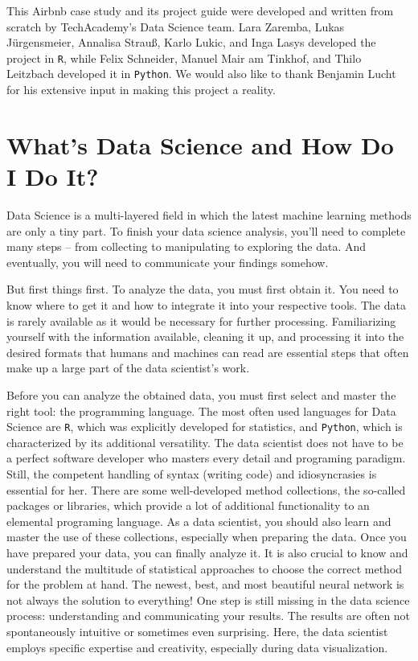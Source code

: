 \documentclass[
  11pt,
]{article}
\begin{document}
This Airbnb case study and its project guide were developed and written from scratch by TechAcademy's Data Science team. Lara Zaremba, Lukas Jürgensmeier, Annalisa Strauß, Karlo Lukic, and Inga Lasys developed the project in \texttt{R}, while Felix Schneider, Manuel Mair am Tinkhof, and Thilo Leitzbach developed it in \texttt{Python}. We would also like to thank Benjamin Lucht for his extensive input in making this project a reality.

\hypertarget{whats-data-science-and-how-do-i-do-it}{%
\section{What's Data Science and How Do I Do It?}\label{whats-data-science-and-how-do-i-do-it}}

Data Science is a multi-layered field in which the latest machine learning methods are only a tiny part. To finish your data science analysis, you'll need to complete many steps -- from collecting to manipulating to exploring the data. And eventually, you will need to communicate your findings somehow.

But first things first. To analyze the data, you must first obtain it. You need to know where to get it and how to integrate it into your respective tools. The data is rarely available as it would be necessary for further processing. Familiarizing yourself with the information available, cleaning it up, and processing it into the desired formats that humans and machines can read are essential steps that often make up a large part of the data scientist's work.

Before you can analyze the obtained data, you must first select and master the right tool: the programming language. The most often used languages for Data Science are \texttt{R}, which was explicitly developed for statistics, and \texttt{Python}, which is characterized by its additional versatility. The data scientist does not have to be a perfect software developer who masters every detail and programing paradigm. Still, the competent handling of syntax (writing code) and idiosyncrasies is essential for her.
There are some well-developed method collections, the so-called packages or libraries, which provide a lot of additional functionality to an elemental programing language. As a data scientist, you should also learn and master the use of these collections, especially when preparing the data.
Once you have prepared your data, you can finally analyze it. It is also crucial to know and understand the multitude of statistical approaches to choose the correct method for the problem at hand. The newest, best, and most beautiful neural network is not always the solution to everything!
One step is still missing in the data science process: understanding and communicating your results. The results are often not spontaneously intuitive or sometimes even surprising. Here, the data scientist employs specific expertise and creativity, especially during data visualization.
\end{document}
